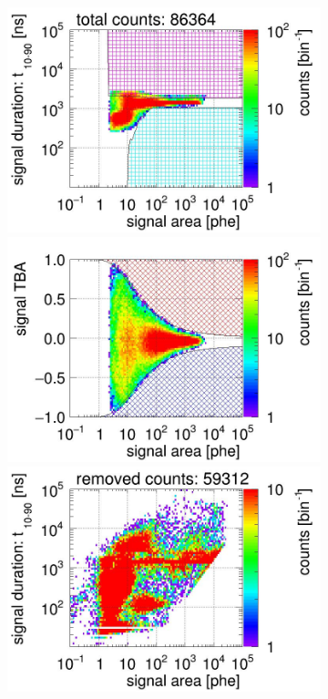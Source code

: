 \begin{landscape}
\begin{figure}[!p]
\begin{subfigure}[t]{0.32\textwidth}
			\includegraphics[width=\figurewidth,clip,trim={0 98 0 15}]{Figures/GasTest/CutsValid/res64771/pdpa23Vecfig64771.jpg}
			\includegraphics[width=\figurewidth,clip,trim={0 98 0 40}]{Figures/GasTest/CutsValid/res64771/tbapa23Vecfig64771.jpg}
			\includegraphics[width=\figurewidth,clip,trim={0 98 0 15}]{Figures/GasTest/CutsValid/res64771/pdpaX23Vecfig64771.jpg}

\end{subfigure}
\end{figure}
\end{landscape}
